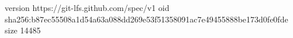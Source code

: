 version https://git-lfs.github.com/spec/v1
oid sha256:b87ec55508a1d54a63a088dd269e53f51358091ac7e49455888be173d0fe0fde
size 14485
